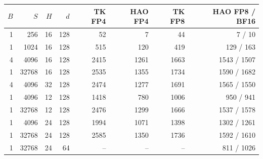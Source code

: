 \begin{tabular}{rrrrrrrr}
\toprule
$B$ & $S$ & $H$ & $d$ & TK FP4 & HAO FP4 & TK FP8 & HAO FP8 / BF16 \\
\midrule
1 & 256 & 16 & 128 & 52 & 7 & 44 & 7 / 10 \\
1 & 1024 & 16 & 128 & 515 & 120 & 419 & 129 / 163 \\
4 & 4096 & 16 & 128 & 2415 & 1261 & 1663 & 1543 / 1507 \\
1 & 32768 & 16 & 128 & 2535 & 1355 & 1734 & 1590 / 1682 \\
4 & 4096 & 32 & 128 & 2474 & 1277 & 1691 & 1565 / 1550 \\
1 & 4096 & 12 & 128 & 1418 & 780 & 1006 & 950 / 941 \\
1 & 32768 & 12 & 128 & 2476 & 1299 & 1666 & 1537 / 1578 \\
1 & 4096 & 24 & 128 & 1994 & 1071 & 1398 & 1302 / 1261 \\
1 & 32768 & 24 & 128 & 2585 & 1350 & 1736 & 1592 / 1610 \\
1 & 32768 & 24 & 64 & -- & -- & -- & 811 / 1026 \\
\bottomrule
\end{tabular}
